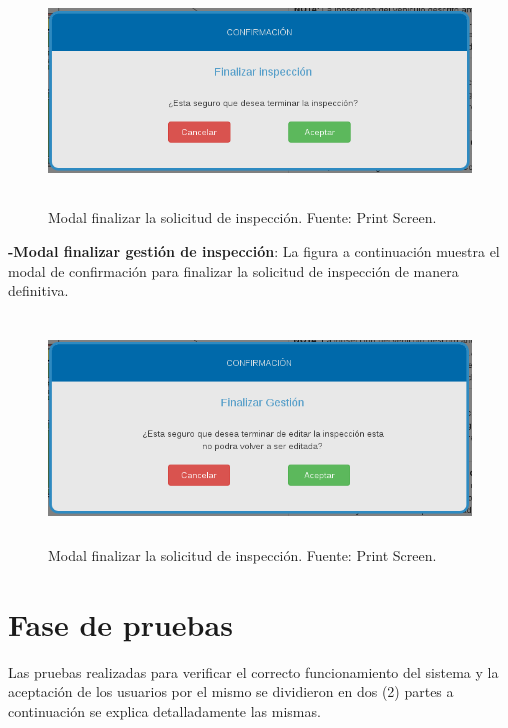\begin{figure}[H]
\begin{center}
	\includegraphics[width=14cm,height=6cm]{img/interfaces/modal_finalizar_inspeccion.png}
\end{center}
\caption{Modal finalizar la solicitud de inspección. Fuente: Print Screen.}
\label{fig:modal_finalizar_registro_dato_solicitud}
\end{figure}

\setlength{\parskip}{0mm}



\textbf{-Modal finalizar gestión de inspección}: La figura a continuación muestra el modal de confirmación para finalizar la solicitud de inspección de manera definitiva.

\begin{figure}[H]
\begin{center}
	\includegraphics[width=14cm,height=6cm]{img/interfaces/modal_finalizar_gestion.png}
\end{center}
\caption{Modal finalizar la solicitud de inspección. Fuente: Print Screen.}
\label{fig:modal_finalizar_gestion_dato_solicitud}
\end{figure}

\setlength{\parskip}{0mm}




\section{Fase de pruebas } 
\setlength{\parskip}{5mm}
Las pruebas realizadas para verificar el correcto funcionamiento del sistema y la aceptación de los usuarios por el mismo se dividieron en dos (2) partes a continuación se explica detalladamente las mismas.

